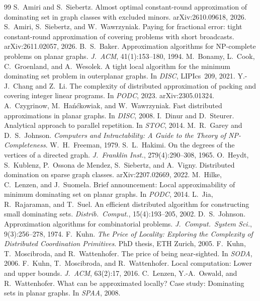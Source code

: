 \documentclass[11pt]{article}
\theoremstyle{remark}
\begin{document}
\begin{thebibliography}{99}
 S.~Amiri and S.~Siebertz. Almost optimal constant-round approximation of dominating
  set in graph classes with excluded minors. arXiv:2610.09618, 2026.
 S.~Amiri, S.~Siebertz, and W.~Wawrzyniak. Paying for fractional error: tight
  constant-round approximation of covering problems with short broadcasts. arXiv:2611.02057, 2026.
 B.~S.~Baker. Approximation algorithms for NP-complete problems on planar graphs.
  \emph{J.\ ACM}, 41(1):153--180, 1994.
 M.~Bonamy, L.~Cook, C.~Groenland, and A.~Wesolek. A tight local algorithm for the minimum
  dominating set problem in outerplanar graphs. In \emph{DISC}, LIPIcs~209, 2021.
 Y.-J.~Chang and Z.~Li. The complexity of distributed approximation of packing and
  covering integer linear programs. In \emph{PODC}, 2023. arXiv:2305.01324.
 A.~Czygrinow, M.~Ha\'n\'ckowiak, and W.~Wawrzyniak. Fast distributed approximations
  in planar graphs. In \emph{DISC}, 2008.
 I.~Dinur and D.~Steurer. Analytical approach to parallel repetition. In \emph{STOC},
  2014.
 M.~R.~Garey and D.~S.~Johnson. \emph{Computers and Intractability: A Guide to the
  Theory of NP-Completeness}. W.~H.~Freeman, 1979.
 S.~L.~Hakimi. On the degrees of the vertices of a directed graph. \emph{J.\ Franklin
  Inst.}, 279(4):290--308, 1965.
 O.~Heydt, S.~Kublenz, P.~Ossona de Mendez, S.~Siebertz, and A.~Vigny. Distributed
  domination on sparse graph classes. arXiv:2207.02669, 2022.
 M.~Hilke, C.~Lenzen, and J.~Suomela. Brief announcement: Local approximability of
  minimum dominating set on planar graphs. In \emph{PODC}, 2014.
 L.~Jia, R.~Rajaraman, and T.~Suel. An efficient distributed algorithm for
  constructing small dominating sets. \emph{Distrib.\ Comput.}, 15(4):193--205, 2002.
 D.~S.~Johnson. Approximation algorithms for combinatorial problems. \emph{J.\ Comput.\
  System Sci.}, 9(3):256--278, 1974.
 F.~Kuhn. \emph{The Price of Locality: Exploring the Complexity of Distributed
  Coordination Primitives}. PhD thesis, ETH Zurich, 2005.
 F.~Kuhn, T.~Moscibroda, and R.~Wattenhofer. The price of being near-sighted. In
  \emph{SODA}, 2006.
 F.~Kuhn, T.~Moscibroda, and R.~Wattenhofer. Local computation: Lower and upper
  bounds. \emph{J.\ ACM}, 63(2):17, 2016.
 C.~Lenzen, Y.-A.~Oswald, and R.~Wattenhofer. What can be approximated locally?
  Case study: Dominating sets in planar graphs. In \emph{SPAA}, 2008.

\end{thebibliography}
\end{document}
